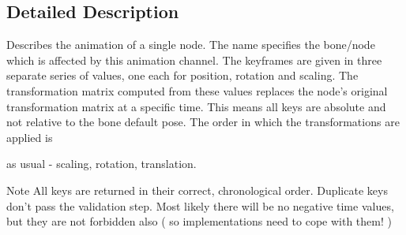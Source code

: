 \subsection{\-Detailed \-Description}
\-Describes the animation of a single node. \-The name specifies the bone/node which is affected by this animation channel. \-The keyframes are given in three separate series of values, one each for position, rotation and scaling. \-The transformation matrix computed from these values replaces the node's original transformation matrix at a specific time. \-This means all keys are absolute and not relative to the bone default pose. \-The order in which the transformations are applied is
\begin{DoxyItemize}
\item as usual -\/ scaling, rotation, translation.
\end{DoxyItemize}

\begin{DoxyNote}{\-Note}
\-All keys are returned in their correct, chronological order. \-Duplicate keys don't pass the validation step. \-Most likely there will be no negative time values, but they are not forbidden also ( so implementations need to cope with them! ) 
\end{DoxyNote}


